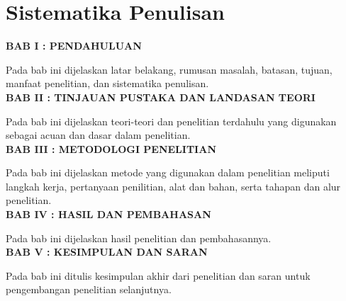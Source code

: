 \section{Sistematika Penulisan}
\noindent
\textbf{BAB I : PENDAHULUAN}

Pada bab ini dijelaskan latar belakang, rumusan masalah, batasan, tujuan, manfaat penelitian, dan sistematika penulisan.\\

\noindent
\textbf{BAB II : TINJAUAN PUSTAKA DAN LANDASAN TEORI}

Pada bab ini dijelaskan teori-teori dan penelitian terdahulu yang digunakan sebagai acuan dan dasar dalam penelitian.\\

\noindent
\textbf{BAB III : METODOLOGI PENELITIAN}

Pada bab ini dijelaskan metode yang digunakan dalam penelitian meliputi langkah kerja, pertanyaan penilitian, alat dan bahan, serta tahapan dan alur penelitian.\\

\noindent
\textbf{BAB IV : HASIL DAN PEMBAHASAN}

Pada bab ini dijelaskan hasil penelitian dan pembahasannya.\\

\noindent
\textbf{BAB V : KESIMPULAN DAN SARAN}

Pada bab ini ditulis kesimpulan akhir dari penelitian dan saran untuk pengembangan penelitian selanjutnya.\\

